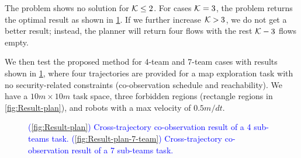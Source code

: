 \documentclass[10pt,twocolumn,twoside]{IEEEtran}
\newcommand{\new}[1]{\textcolor{blue}{#1}}
\begin{document}
The problem shows no solution for $\mathcal{K}\leq 2$. For cases $\mathcal{K}=3$, the problem returns the optimal result as shown in \cref{fig:Cross-trajectory-result}. If we further increase $\mathcal{K}>3$, we do not get a better result; instead, the planner will return four flows with the rest $\mathcal{K}-3$ flows empty. 

We then test the proposed method for 4-team and 7-team cases with results shown in \cref{fig:Cross-trajectory-result}, where four trajectories are provided for a map exploration task with no security-related constraints (co-observation schedule and reachability). We have a $10m\times10m$ task space, three forbidden regions (rectangle regions in \cref{fig:Result-plan}), and robots with a max velocity of $0.5m/dt$. 

\begin{figure}
  \centering
  \caption{\new{(\ref{fig:Result-plan}) Cross-trajectory co-observation result of a 4 sub-teams task. (\ref{fig:Result-plan-7-team}) Cross-trajectory co-observation result of a 7 sub-teams task.}}\label{fig:Cross-trajectory-result}
\end{figure}
\end{document}
